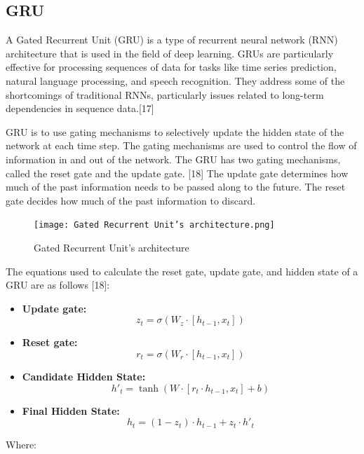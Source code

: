 \documentclass{ieeeojies}
\begin{document}
\subsection{GRU}
A Gated Recurrent Unit (GRU) is a type of recurrent neural network (RNN) architecture that is used in the field of deep learning. GRUs are particularly effective for processing sequences of data for tasks like time series prediction, natural language processing, and speech recognition. They address some of the shortcomings of traditional RNNs, particularly issues related to long-term dependencies in sequence data.[17]

GRU is to use gating mechanisms to selectively update the hidden state of the network at each time step. The gating mechanisms are used to control the flow of information in and out of the network. The GRU has two gating mechanisms, called the reset gate and the update gate. [18] The update gate determines how much of the past information needs to be passed along to the future. The reset gate decides how much of the past information to discard.
\begin{figure}[H]
    \centering
    \begin{minipage}{0.30\textwidth}
    \centering
    \texttt{[image: Gated Recurrent Unit’s architecture.png]}
    \caption{Gated Recurrent Unit’s architecture}
    \label{fig:1}
    \end{minipage}
\end{figure}
The equations used to calculate the reset gate, update gate, and hidden state of a GRU are as follows [18]:
\begin{itemize}[label={--}]
    \item \textbf{Update gate:} \[z_t = \sigma(W_z \cdot [h_{t-1}, x_t])\]
    \item \textbf{Reset gate:} \[r_t = \sigma(W_r \cdot [h_{t-1}, x_t])\]
    \item \textbf{Candidate Hidden State:} \[h'_t = \tanh(W \cdot [r_t \cdot h_{t-1}, x_t] + b)\]
    \item \textbf{Final Hidden State:}  \[h_t = (1 - z_t) \cdot h_{t-1} + z_t \cdot h'_t\]
\end{itemize}
Where: 
\end{document}
